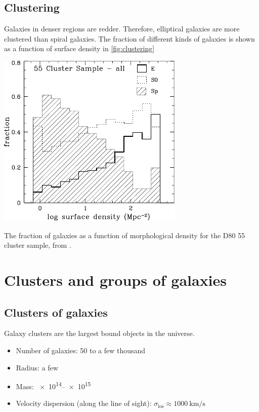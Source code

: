 \subsection{Clustering}
Galaxies in denser regions are redder.
Therefore, elliptical galaxies are more clustered than spiral galaxies.
The fraction of different kinds of galaxies is shown as a function of surface density in \cref{fig:clustering}
\begin{marginfigure}
	\includegraphics[width=\textwidth]{img/ch-05/clustering.pdf}
	\caption{The fraction of galaxies as a function of morphological density for the D80 55 cluster sample, from \cite{Dressler_1997}.}
	\label{fig:clustering}
\end{marginfigure}







\section{Clusters and groups of galaxies}

\subsection{Clusters of galaxies}
Galaxy clusters are the largest bound objects in the universe.
\begin{itemize}
	\item Number of galaxies: 50 to a few thousand
	\item Radius: a few \si{\mega\parsec}
	\item Mass: \SIrange{e14}{e15}{\solarmass}
	\item Velocity dispersion (along the line of sight): $\sigma_\text{los} \approx \SI{1000}{\kilo\metre\per\second}$
\end{itemize}

